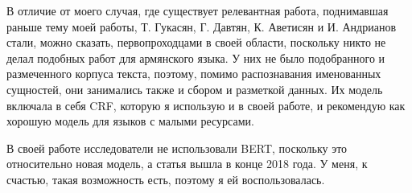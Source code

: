 В отличие от моего случая, где существует релевантная работа, поднимавшая раньше тему моей работы, Т. Гукасян, Г. Давтян, К. Аветисян и И. Андрианов стали, можно сказать, первопроходцами в своей области, поскольку никто не делал подобных работ для армянского языка. У них не было подобранного и размеченного корпуса текста, поэтому, помимо распознавания именованных сущностей, они занимались также и сбором и разметкой данных. Их модель включала в себя CRF, которую я использую и в своей работе, и рекомендую как хорошую модель для языков с малыми ресурсами.

В своей работе исследователи не использовали BERT, поскольку это относительно новая модель, а статья вышла в конце 2018 года. У меня, к счастью, такая возможность есть, поэтому я ей воспользовалась.










